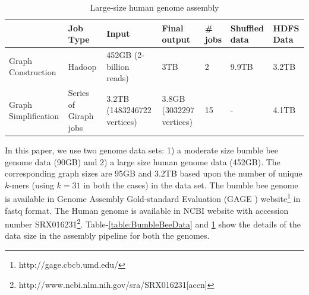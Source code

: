 \documentclass[conference]{IEEEtran}
\begin{document}
\begin{table}
\begin{center}
    \begin{tabular}{ |p{1.1cm} | p{0.8cm} | p{1.1cm} | p{0.8cm} | p{0.8cm} | p{0.8cm} | p{0.8cm}|} \hline
    & Job Type & Input & Final output & \# jobs & Shuffled data & HDFS Data \\ \hline
    Graph Construction & Hadoop & 452GB (2-billion reads) & 3TB & 2 & 9.9TB & 3.2TB \\ \hline
    Graph Simplification & Series of Giraph jobs & 3.2TB (1483246722 vertices) & 3.8GB (3032297 vertices) & 15 & - & 4.1TB \\ \hline    
    \end{tabular}
    \caption{Large-size human genome assembly}
	\label{table:HumanData}
\end{center}
\vspace{-3.0em}
\end{table}
In this paper, we use two genome data sets: 1) a moderate size bumble bee genome data (90GB) and 2) a large size human genome data (452GB). 
The corresponding graph sizes are 95GB and 3.2TB based upon the number of unique $k$-mers (using $k=31$ in both the cases) in the data set. 
The bumble bee genome is available in Genome Assembly Gold-standard Evaluation (GAGE \cite{bio:gage}) website\footnote{http://gage.cbcb.umd.edu/} in fastq format. 
The Human genome is available in NCBI website with accession number SRX016231\footnote{http://www.ncbi.nlm.nih.gov/sra/SRX016231[accn]}. 
Table-\ref{table:BumbleBeeData} and \ref{table:HumanData} show the details of the data size in the assembly pipeline for both the genomes. 
\end{document}
